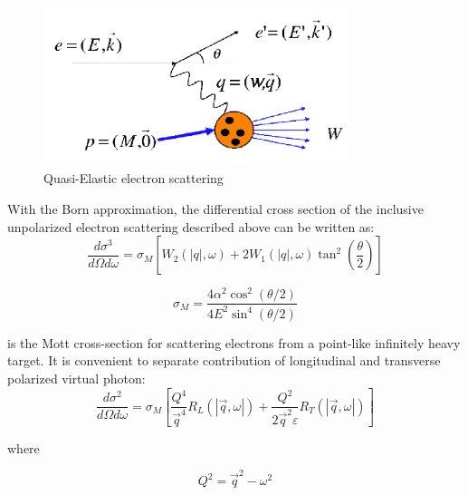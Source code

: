 \begin{figure}[h]
\centering
\includegraphics[width=0.8\textwidth]{figs/feynman_diagram.png}
\caption[scattering spectrum]{Quasi-Elastic electron scattering \label{fig:feynman_diagram}}
\end{figure}

With the Born approximation, the differential cross section of the inclusive unpolarized electron scattering described above can be written as:
\begin{equation}
\frac{d\sigma^3}{d\Omega d\omega} = \sigma_M \left[ W_2(|q|,\omega) + 2W_1(|q|,\omega)\tan^2\left(\frac{\theta}{2}\right) \right]
\end{equation}


\begin{equation}
  \sigma_M=\frac{4\alpha^2 \cos^2(\theta/2)}{4E^2\sin^4(\theta/2)}
\end{equation}

is the  Mott cross-section for scattering electrons from a point-like infinitely heavy target. 
It is convenient to separate contribution of longitudinal and transverse polarized virtual photon:
\begin{equation}
\frac{d\sigma^2}{d\Omega d\omega} =  \sigma_M \left[ \frac{Q^4}{\vec{q}^4}R_L(|\vec{q},\omega|)+\frac{Q^2}{2\vec{q}^2\varepsilon}R_T(|\vec{q},\omega|) \right]
\end{equation}


where 

\begin{equation}
Q^2 = \vec{q}^2 - \omega^2
\end{equation}

